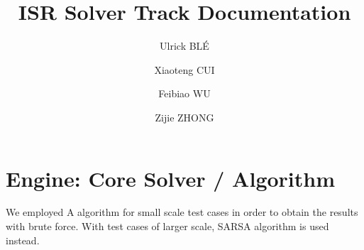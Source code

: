 \documentclass{article}
\date{}
\title{ISR Solver Track Documentation}
\author[1]{Ulrick BLÉ}
\author[1]{Xiaoteng CUI}
\author[1]{Feibiao WU}
\author[1]{Zijie ZHONG}
\affil[1]{École Centrale de Nantes}
\begin{document}
\maketitle

\section{Engine: Core Solver / Algorithm}
We employed A\* algorithm for small scale test cases in order to obtain the results with brute force. With test cases of larger scale, SARSA algorithm is used instead. 
\end{document}
